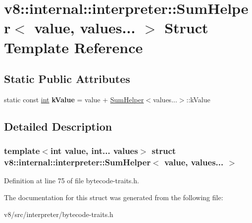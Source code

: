 \hypertarget{structv8_1_1internal_1_1interpreter_1_1SumHelper_3_01value_00_01values_8_8_8_01_4}{}\section{v8\+:\+:internal\+:\+:interpreter\+:\+:Sum\+Helper$<$ value, values... $>$ Struct Template Reference}
\label{structv8_1_1internal_1_1interpreter_1_1SumHelper_3_01value_00_01values_8_8_8_01_4}
\subsection*{Static Public Attributes}
\begin{DoxyCompactItemize}
\item 
\mbox{\label{structv8_1_1internal_1_1interpreter_1_1SumHelper_3_01value_00_01values_8_8_8_01_4_a2ad9d2816a98ccf549c1b6ffb79c6aa2}} 
static const \mbox{\hyperlink{classint}{int}} {\bfseries k\+Value} = value + \mbox{\hyperlink{structv8_1_1internal_1_1interpreter_1_1SumHelper}{Sum\+Helper}}$<$values...$>$\+::k\+Value
\end{DoxyCompactItemize}


\subsection{Detailed Description}
\subsubsection*{template$<$int value, int... values$>$\newline
struct v8\+::internal\+::interpreter\+::\+Sum\+Helper$<$ value, values... $>$}



Definition at line 75 of file bytecode-\/traits.\+h.



The documentation for this struct was generated from the following file\+:\begin{DoxyCompactItemize}
\item 
v8/src/interpreter/bytecode-\/traits.\+h\end{DoxyCompactItemize}
